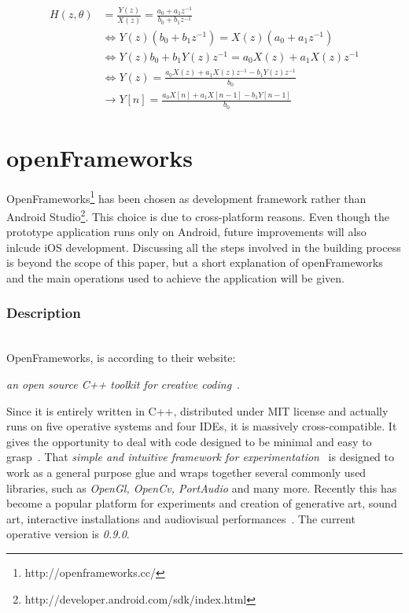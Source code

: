 \documentclass[journal]{IEEEtran}
\begin{document}
\begin{appendices}
\begin{equation*}\label{eq:DerivationC++}
\begin{split}
H(z, \theta) &= \frac{Y(z)}{X(z)} = \frac{a_0+a_1z^{-1}}{b_0+b_1z^{-1}}\\
&\iff Y(z)(b_0+b_1z^{-1}) = X(z)(a_0+a_1z^{-1})\\
&\iff Y(z)b_0+b_1Y(z)z^{-1} = a_0X(z)+a_1X(z)z^{-1}\\
&\iff Y(z) = \frac{a_0X(z)+a_1X(z)z^{-1}-b_1Y(z)z^{-1}}{b_0}\\
&\rightarrow Y[n] = \frac{a_0X[n]+a_1X[n-1]-b_1Y[n-1]}{b_0}
\end{split}
\end{equation*} 

\pagebreak

\section{openFrameworks}
OpenFrameworks\footnote{http://openframeworks.cc/\label{refOF}} has been chosen as development framework rather than Android Studio\footnote{http://developer.android.com/sdk/index.html}. This choice is due to cross-platform reasons. Even though the prototype application runs only on Android, future improvements will also inlcude iOS development.
Discussing all the steps involved in the building process is beyond the scope of this paper, but a short explanation of openFrameworks and the main operations used to achieve the application will be given. \\
\subsubsection{Description}~\\
OpenFrameworks, is according to their website:
\begin{center}
{\footnotesize{\textit{an open source C++ toolkit for creative coding}}~\cite{OpenFrameworks}.}
\end{center}
Since it is entirely written in C++, distributed under MIT license and actually runs on five operative systems and four IDEs, it is massively cross-compatible. It gives the opportunity to deal with code designed to be minimal and easy to grasp~\cite{OpenFrameworks}. 
That \textit{simple and intuitive framework for experimentation}~\cite{OpenFrameworks} is designed to work as a general purpose glue and wraps together several commonly used libraries, such as \emph{OpenGl, OpenCv, PortAudio} and many more. Recently this has become a popular platform for experiments and creation of generative art, sound art, interactive installations and audiovisual performances~\cite{OpenFrameworks}. The current operative version is \emph{0.9.0}.


\end{appendices}
\end{document}
